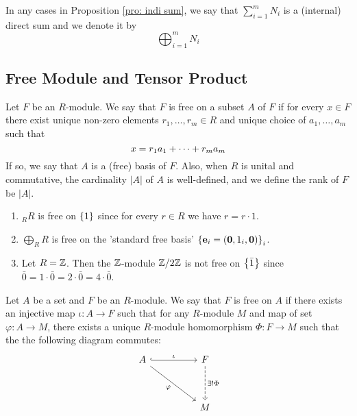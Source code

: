 \begin{re} 
    In any cases in Proposition \ref{pro: indi sum}, we say that $\sum_{i=1}^m N_i$ is a (internal) direct sum and we denote it by 
    \[\bigoplus_{i=1}^m N_i\]
\end{re}

\newpage
\subsection{Free Module and Tensor Product}
\begin{defn} 
    Let $F$ be an $R$-module. We say that $F$ is free on a subset $A$ of $F$ if for every $x\in F$ there exist unique non-zero elements $r_1, \dots, r_m\in R$ and unique choice of $a_1, \dots, a_m$ such that 
    \[x= r_1a_1 +\dots+ r_m a_m\]
    If so, we say that $A$ is a (free) basis of $F$. Also, when $R$ is unital and commutative, the cardinality $|A|$ of $A$ is well-defined, and we define the rank of $F$ be $|A|$.
\end{defn}

\medskip

\begin{ex}
    \hfill
    \begin{enumerate}
        \item $_RR$ is free on $\left\{1\right\}$ since for every $r\in R$ we have $r=r\cdot 1$.
        \item $\bigoplus_RR$ is free on the 'standard free basis' $\left\{\mathbf{e}_i = \left(\mathbf{0}, 1_i, \mathbf{0}\right)\right\}_i$.
        \item Let $R={\mathbb Z}$. Then the ${\mathbb Z}$-module ${\mathbb Z}/2{\mathbb Z}$ is not free on $\left\{\bar{1}\right\}$ since $\bar{0}=1\cdot \bar{0}=2\cdot \bar{0}=4\cdot \bar{0}$.
    \end{enumerate}
\end{ex}

\medskip

\begin{defn} 
    Let $A$ be a set and $F$ be an $R$-module. We say that $F$ is free on $A$ if there exists an injective map $\iota: A\to F$ such that for any $R$-module $M$ and map of set $\varphi:A\to M$, there exists a unique $R$-module homomorphism $\Phi:F\to M$ such that the the following diagram commutes:
    \[\begin{tikzcd}
	   A && F \\
	   \\
	   && M
	   \arrow["\iota", hook, from=1-1, to=1-3]
	   \arrow["\varphi"', from=1-1, to=3-3]
	   \arrow["{\exists! \Phi}", dashed, from=1-3, to=3-3]
    \end{tikzcd}\]
\end{defn}

